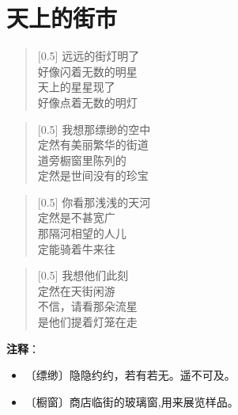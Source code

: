 \documentclass[12pt,UTF-8,openany]{ctexbook}
\begin{document}
\chapter{天上的街市}

\begin{normalsize}
    
    \begin{verse}[0.5\linewidth]
        远远的街灯明了 \\
        好像闪着无数的明星 \\
        天上的星星现了 \\
        好像点着无数的明灯
    \end{verse}
    
    
    \begin{verse}[0.5\linewidth]
        我想那缥缈的空中 \\
        定然有美丽繁华的街道 \\
        道旁橱窗里陈列的 \\
        定然是世间没有的珍宝
    \end{verse}
    
    
    \begin{verse}[0.5\linewidth]
        你看那浅浅的天河 \\
        定然是不甚宽广 \\
        那隔河相望的人儿 \\
        定能骑着牛来往
    \end{verse}
    
    
    \begin{verse}[0.5\linewidth]
        我想他们此刻 \\
        定然在天街闲游 \\
        不信，请看那朵流星 \\
        是他们提着灯笼在走
    \end{verse}
    
\end{normalsize}


\newpage

\textbf{注释}：

\vspace{-1em}

\begin{itemize}
    \setlength\itemsep{-0.2em}
    \item 〔缥缈〕隐隐约约，若有若无。遥不可及。
    \item 〔橱窗〕商店临街的玻璃窗,用来展览样品。
\end{itemize}
\end{document}
